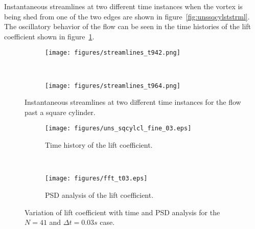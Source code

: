 Instantaneous streamlines at two different time instances when the vortex is being shed from one of the two edges are shown in figure~\ref{fig:unssqcylststrml}. The oscillatory behavior of the flow can be seen in the time histories of the lift coefficient shown in figure~\ref{fig:unssqcyllift}.
\begin{figure}[h!]
    \centering
    \captionsetup{justification=centering}
    \begin{subfigure}[b]{0.48\textwidth}
    \captionsetup{justification=centering}
        \texttt{[image: figures/streamlines\_t942.png]}    
    \end{subfigure}
    ~ %
    \begin{subfigure}[b]{0.48\textwidth}
    \centering
    \captionsetup{justification=centering}
        \texttt{[image: figures/streamlines\_t964.png]}
    \end{subfigure}
    \caption{Instantaneous streamlines at two different time instances for the flow past a square cylinder.}
\end{figure}
\label{fig:unssqcylststrml}
\begin{figure}[h!]
    \centering
    \captionsetup{justification=centering}
    \begin{subfigure}[b]{0.48\textwidth}
    \captionsetup{justification=centering}
        \texttt{[image: figures/uns\_sqcylcl\_fine\_03.eps]}    
   \caption{Time history of the lift coefficient.}
    \end{subfigure}
    ~ %
    \begin{subfigure}[b]{0.48\textwidth}
    \centering
    \captionsetup{justification=centering}
        \texttt{[image: figures/fft\_t03.eps]}
        \caption{PSD analysis of the lift coefficient.}
    \end{subfigure}
    \caption{Variation of lift coefficient with time and PSD analysis for the $N=41$ and $\Delta t = 0.03s$ case.}
    \label{fig:unssqcyllift}
\end{figure}


